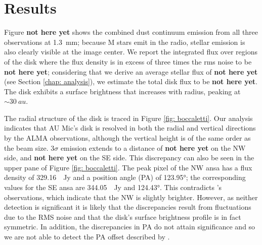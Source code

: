 \documentclass[12pt,oneside]{book}
\begin{document}
\chapter{Results}
\label{chap: results}
Figure \textbf{not here yet} shows the combined dust continuum emission from all three observations at \SI{1.3}{mm}; because M stars emit in the radio, stellar emission is also clearly visible at the image center.
We report the integrated flux over regions of the disk where the flux density is in excess of three times the rms noise to be \textbf{not here yet}; considering that we derive an average stellar flux of \textbf{not here yet} (see Section \ref{chap: analysis}), we estimate the total disk flux to be \textbf{not here yet}.
The disk exhibits a surface brightness that increases with radius, peaking at $\sim \SI{30}{au}$.

The radial structure of the disk is traced in Figure \ref{fig: boccaletti}. 
Our analysis indicates that AU Mic's disk is resolved in both the radial and vertical directions by the ALMA observations, although the vertical height is of the same order as the beam size. 
$3\sigma$ emission extends to a distance of \textbf{not here yet} on the NW side, and \textbf{not here yet} on the SE side. 
This discrepancy can also be seen in the upper pane of Figure \ref{fig: boccaletti}. 
The peak pixel of the NW ansa has a flux density of \SI{329.16}{\mu Jy} and a position angle (PA) of \ang{123.95}; the corresponding values for the SE ansa are \SI{344.05}{\mu Jy} and \ang{124.43}. 
This contradicts \cite{macgregor13}'s observations, which indicate that the NW is slightly brighter.
However, as neither detection is significant it is likely that the discrepancies result from fluctuations due to the RMS noise and that the disk's surface brightness profile is in fact symmetric. 
In addition, the discrepancies in PA do not attain significance and so we are not able to detect the PA offset described by \cite{boccaletti15}. 
\end{document}

